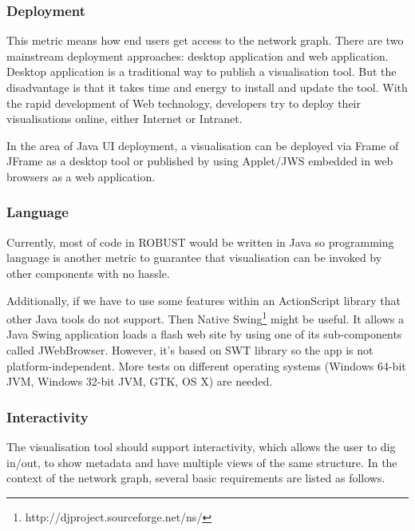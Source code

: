 \subsubsection{Deployment}
This metric means how end users get access to the network graph. There are two mainstream deployment approaches: desktop application and web application. Desktop application is a traditional way to publish a visualisation tool. But the disadvantage is that it takes time and energy to install and update the tool. With the rapid development of Web technology, developers try to deploy their visualisations online, either Internet or Intranet.

In the area of Java UI deployment, a visualisation can be deployed via Frame of JFrame as a desktop tool or published by using Applet/JWS embedded in web browsers as a web application. 

\subsubsection{Language}
Currently, most of code in ROBUST would be written in Java so programming language is another metric to guarantee that visualisation can be invoked by other components with no hassle.

Additionally, if we have to use some features within an ActionScript library that other Java tools do not support. Then Native Swing\footnote{http://djproject.sourceforge.net/ns/} might be useful. It allows a Java Swing application loads a flash web site by using one of its sub-components called JWebBrowser. However, it's based on SWT library so the app is not platform-independent. More tests on different operating systems (Windows 64-bit JVM, Windows 32-bit JVM, GTK, OS X) are needed.

\subsubsection{Interactivity}
The visualisation tool should support interactivity, which allows the user to dig in/out, to show metadata and have multiple views of the same structure. In the context of the network graph, several basic requirements are listed as follows.

